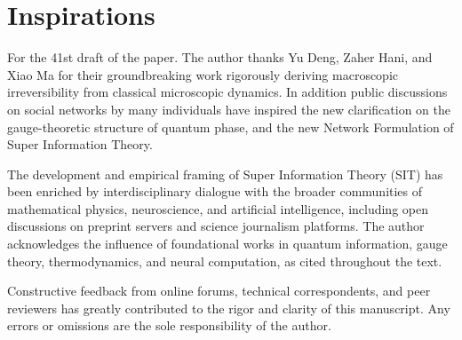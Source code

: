 \documentclass[american,11pt,letterpaper]{article}
\begin{document}
\setcounter{subsection}{0}
\section*{Inspirations}
For the 41st draft of the paper. The author thanks Yu Deng, Zaher Hani, and Xiao Ma for their groundbreaking work rigorously deriving macroscopic irreversibility from classical microscopic dynamics. In addition public discussions on social networks by many individuals have inspired the new clarification on the gauge-theoretic structure of quantum phase, and the new Network Formulation of Super Information Theory. 

The development and empirical framing of Super Information Theory (SIT) has been enriched by interdisciplinary dialogue with the broader communities of mathematical physics, neuroscience, and artificial intelligence, including open discussions on preprint servers and science journalism platforms. The author acknowledges the influence of foundational works in quantum information, gauge theory, thermodynamics, and neural computation, as cited throughout the text.

Constructive feedback from online forums, technical correspondents, and peer reviewers has greatly contributed to the rigor and clarity of this manuscript. Any errors or omissions are the sole responsibility of the author.
\end{document}
